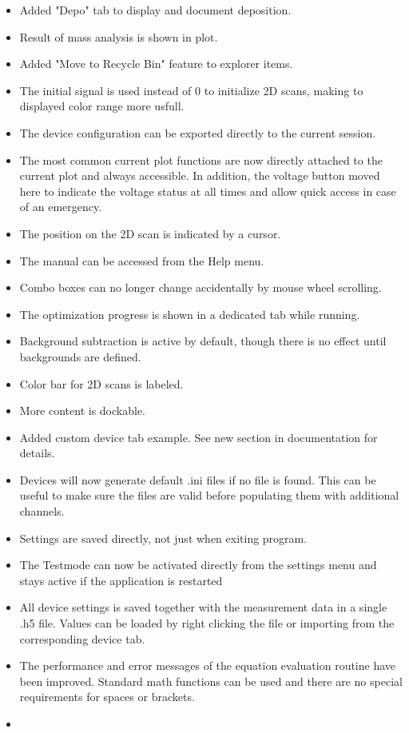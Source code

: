 \documentclass[a4paper,11pt,DIV=13]{scrartcl}
\begin{document}
\begin{itemize}
\item Added "Depo" tab to display and document deposition.
\item Result of mass analysis is shown in plot.
\item Added "Move to Recycle Bin" feature to explorer items.
\item The initial signal is used instead of 0 to initialize 2D scans, making to displayed color range more usfull.
\item The device configuration can be exported directly to the current session.
\item The most common current plot functions are now directly attached to the current plot and always accessible. In addition, the voltage button moved here to indicate the voltage status at all times and allow quick access in case of an emergency.
\item The position on the 2D scan is indicated by a cursor.
\item The manual can be accessed from the Help menu.
\item Combo boxes can no longer change accidentally by mouse wheel scrolling.
\item The optimization progress is shown in a dedicated tab while running.
\item Background subtraction is active by default, though there is no effect until backgrounds are defined.
\item Color bar for 2D scans is labeled.
\item More content is dockable.
\item Added custom device tab example. See new section in documentation for details.
\item Devices will now generate default .ini files if no file is found. This can be useful to make sure the files are valid before populating them with additional channels.
\item Settings are saved directly, not just when exiting program.
\item The Testmode can now be activated directly from the settings menu and stays active if the application is restarted
\item All device settings is saved together with the measurement data in a single .h5 file. Values can be loaded by right clicking the file or importing from the corresponding device tab.
\item The performance and error messages of the equation evaluation routine have been improved. Standard math functions can be used and there are no special requirements for spaces or brackets.
\item
\end{itemize}
\end{document}
